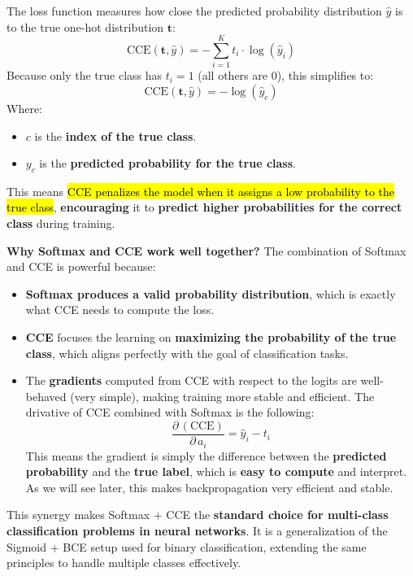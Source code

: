\highspace
The  loss function measures how close the predicted probability distribution $\hat{y}$ is to the true one-hot distribution $\mathbf{t}$:
\begin{equation}\label{eq:cce-loss}
    \text{CCE}(\mathbf{t}, \hat{y}) = - \sum_{i=1}^{K} t_{i} \cdot \log(\hat{y}_{i})
\end{equation}
Because only the true class has $t_{i} = 1$ (all others are 0), this simplifies to:
\begin{equation}
    \text{CCE}(\mathbf{t}, \hat{y}) = - \log(\hat{y}_{c})
\end{equation}
Where:
\begin{itemize}
    \item $c$ is the \textbf{index of the true class}.
    \item $y_{c}$ is the \textbf{predicted probability for the true class}.
\end{itemize}
This means \hl{CCE penalizes the model when it assigns a low probability to the true class}, \textbf{encouraging} it to \textbf{predict higher probabilities for the correct class} during training.

\highspace
\textcolor{Green3}{ \textbf{Why Softmax and CCE work well together?}} The combination of Softmax and CCE is powerful because:
\begin{itemize}
    \item[\textcolor{Green3}{\faIcon{check}}] \textbf{Softmax produces a valid probability distribution}, which is exactly what CCE needs to compute the loss.
    \item[\textcolor{Green3}{\faIcon{check}}] \textbf{CCE} focuses the learning on \textbf{maximizing the probability of the true class}, which aligns perfectly with the goal of classification tasks.
    \item[\textcolor{Green3}{\faIcon{check}}] The \textbf{gradients} computed from CCE with respect to the logits are well-behaved (very simple), making training more stable and efficient. The drivative of CCE combined with Softmax is the following:
    \begin{equation}
        \dfrac{\partial \, \left(\text{CCE}\right)}{\partial \, a_{i}} = \hat{y}_{i} - t_{i}
    \end{equation}
    This means the gradient is simply the difference between the \textbf{predicted probability} and the \textbf{true label}, which is \textbf{easy to compute} and interpret. As we will see later, this makes backpropagation very efficient and stable.
\end{itemize}
This synergy makes Softmax $+$ CCE the \textbf{standard choice for multi-class classification problems in neural networks}. It is a generalization of the Sigmoid $+$ BCE setup used for binary classification, extending the same principles to handle multiple classes effectively.
